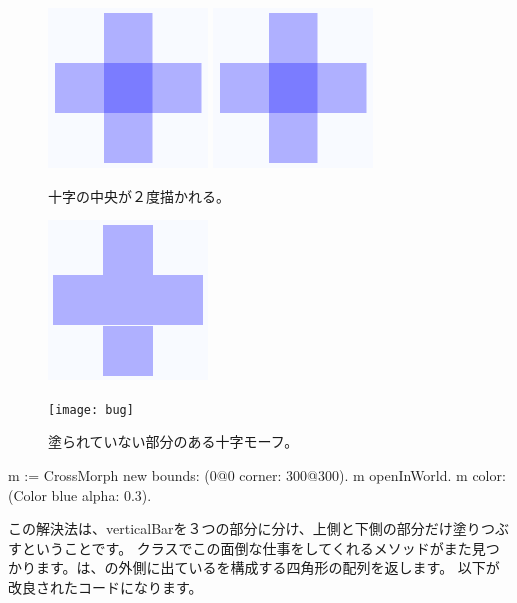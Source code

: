\documentclass[a4paper,10pt,twoside]{book}
\begin{document}
\begin{figure}[t]
\begin{minipage}{0.48\textwidth}
	\ifluluelse
		{\centerline{\includegraphics[scale=0.6]{overdrawBug}}}
		{\centerline{\includegraphics{overdrawBug}}}
	\caption{十字の中央が２度描かれる。
		}
\end{minipage}
\hfill
\begin{minipage}{0.48\textwidth}
	\ifluluelse
		{\centerline{\includegraphics[scale=0.6]{hairlineBug}}}
		{\centerline{\texttt{[image: bug]}}}
	\caption{塗られていない部分のある十字モーフ。
		}
\end{minipage}
\end{figure}


\begin{code}{}
m := CrossMorph new bounds: (0@0 corner: 300@300).
m openInWorld.
m color: (Color blue alpha: 0.3).
\end{code}

\noindent
この解決法は、verticalBarを３つの部分に分け、上側と下側の部分だけ塗りつぶすということです。
クラスでこの面倒な仕事をしてくれるメソッドがまた見つかります。は、の外側に出ているを構成する四角形の配列を返します。
以下が改良されたコードになります。
\end{document}
